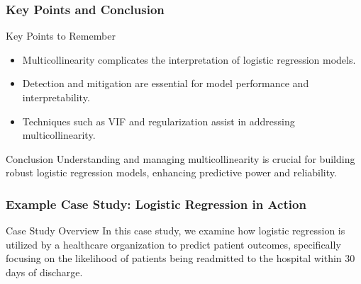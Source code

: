 \documentclass[aspectratio=169]{beamer}
\begin{document}
\begin{frame}[fragile]
    \frametitle{Key Points and Conclusion}
    \begin{block}{Key Points to Remember}
        \begin{itemize}
            \item Multicollinearity complicates the interpretation of logistic regression models.
            \item Detection and mitigation are essential for model performance and interpretability.
            \item Techniques such as VIF and regularization assist in addressing multicollinearity.
        \end{itemize}
    \end{block}
    
    \begin{block}{Conclusion}
        Understanding and managing multicollinearity is crucial for building robust logistic regression models, enhancing predictive power and reliability.
    \end{block}
\end{frame}

\begin{frame}[fragile]
    \frametitle{Example Case Study: Logistic Regression in Action}
    \begin{block}{Case Study Overview}
        In this case study, we examine how logistic regression is utilized by a healthcare organization to predict patient outcomes, 
        specifically focusing on the likelihood of patients being readmitted to the hospital within 30 days of discharge.
    \end{block}
\end{frame}
\end{document}
